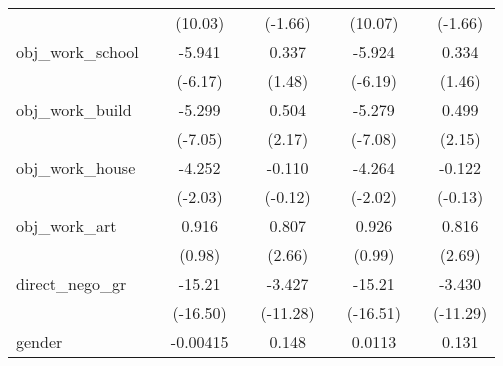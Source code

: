 {\begin{tabular}{l*{8}{c}}
            &                     &     (10.03)         &                     &     (-1.66)         &                     &     (10.07)         &                     &     (-1.66)         \\
[1em]
obj\_work\_school&                     &      -5.941\sym{***}&                     &       0.337         &                     &      -5.924\sym{***}&                     &       0.334         \\
            &                     &     (-6.17)         &                     &      (1.48)         &                     &     (-6.19)         &                     &      (1.46)         \\
[1em]
obj\_work\_build&                     &      -5.299\sym{***}&                     &       0.504\sym{*}  &                     &      -5.279\sym{***}&                     &       0.499\sym{*}  \\
            &                     &     (-7.05)         &                     &      (2.17)         &                     &     (-7.08)         &                     &      (2.15)         \\
[1em]
obj\_work\_house&                     &      -4.252\sym{*}  &                     &      -0.110         &                     &      -4.264\sym{*}  &                     &      -0.122         \\
            &                     &     (-2.03)         &                     &     (-0.12)         &                     &     (-2.02)         &                     &     (-0.13)         \\
[1em]
obj\_work\_art&                     &       0.916         &                     &       0.807\sym{**} &                     &       0.926         &                     &       0.816\sym{**} \\
            &                     &      (0.98)         &                     &      (2.66)         &                     &      (0.99)         &                     &      (2.69)         \\
[1em]
direct\_nego\_gr&                     &      -15.21\sym{***}&                     &      -3.427\sym{***}&                     &      -15.21\sym{***}&                     &      -3.430\sym{***}\\
            &                     &    (-16.50)         &                     &    (-11.28)         &                     &    (-16.51)         &                     &    (-11.29)         \\
[1em]
gender      &                     &    -0.00415         &                     &       0.148         &                     &      0.0113         &                     &       0.131         \\

\end{tabular}}
